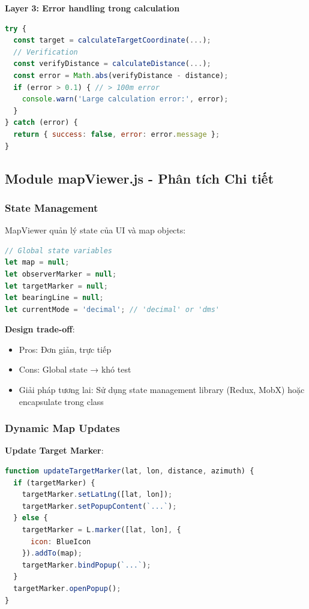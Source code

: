 \textbf{Layer 3: Error handling trong calculation}
\begin{lstlisting}[language=JavaScript]
try {
  const target = calculateTargetCoordinate(...);
  // Verification
  const verifyDistance = calculateDistance(...);
  const error = Math.abs(verifyDistance - distance);
  if (error > 0.1) { // > 100m error
    console.warn('Large calculation error:', error);
  }
} catch (error) {
  return { success: false, error: error.message };
}
\end{lstlisting}

\subsection{Module mapViewer.js - Phân tích Chi tiết}

\subsubsection{State Management}

MapViewer quản lý state của UI và map objects:

\begin{lstlisting}[language=JavaScript]
// Global state variables
let map = null;
let observerMarker = null;
let targetMarker = null;
let bearingLine = null;
let currentMode = 'decimal'; // 'decimal' or 'dms'
\end{lstlisting}

\textbf{Design trade-off}:
\begin{itemize}
    \item Pros: Đơn giản, trực tiếp
    \item Cons: Global state → khó test
    \item Giải pháp tương lai: Sử dụng state management library (Redux, MobX) hoặc encapsulate trong class
\end{itemize}

\subsubsection{Dynamic Map Updates}

\textbf{Update Target Marker}:
\begin{lstlisting}[language=JavaScript]
function updateTargetMarker(lat, lon, distance, azimuth) {
  if (targetMarker) {
    targetMarker.setLatLng([lat, lon]);
    targetMarker.setPopupContent(`...`);
  } else {
    targetMarker = L.marker([lat, lon], { 
      icon: BlueIcon 
    }).addTo(map);
    targetMarker.bindPopup(`...`);
  }
  targetMarker.openPopup();
}
\end{lstlisting}

